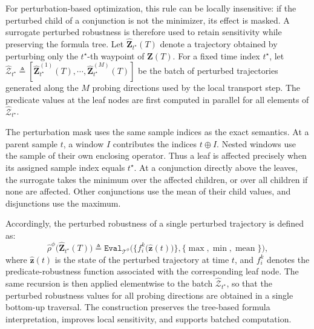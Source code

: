  For perturbation-based optimization, this rule can be
locally insensitive: if the perturbed child of a conjunction is not the
minimizer, its effect is masked. A surrogate perturbed robustness is therefore
used to retain sensitivity while preserving the formula tree.
Let $\widehat{\mathbf{Z}}_{t^\star}(T)$ denote a trajectory obtained by
perturbing only the $t^\star$-th waypoint of $\mathbf{Z}(T)$.
For a fixed time index $t^\star$, let
$\widehat{\boldsymbol{\mathcal{Z}}}_{t^\star}\triangleq
[\widehat{\mathbf{Z}}_{t^\star}^{(1)}(T),\cdots,
\widehat{\mathbf{Z}}_{t^\star}^{(M)}(T)]$
be the batch of perturbed trajectories generated along the $M$ probing
directions used by the local transport step.
The predicate values at the leaf nodes are first computed in parallel
for all elements of
$\widehat{\boldsymbol{\mathcal{Z}}}_{t^\star}$.
\begin{revision}
The perturbation mask uses the same sample indices as the exact semantics.
At a parent sample $t$, a window $I$ contributes the indices $t\oplus I$.
Nested windows use the sample of their own enclosing operator. Thus a
leaf is affected precisely when its assigned sample index equals $t^\star$.
At a conjunction directly above the leaves, the surrogate takes the minimum
over the affected children, or over all children if none are affected.
Other conjunctions use the mean of their child values, and disjunctions
use the maximum.
\end{revision}
Accordingly, the perturbed robustness of a single perturbed trajectory is
defined as:
\begin{equation}
\label{ch06:eq:perturbed-robustness}
\widehat{\rho}^{\phi}\big(\widehat{\mathbf{Z}}_{t^\star}(T)\big)
\triangleq
\texttt{Eval}_{\mathcal{T}^{\phi}}
\Big(
\big\{f_i^k\big(\widehat{\mathbf{z}}(t)\big)\big\},
\{\max,\min,\operatorname{mean}\}
\Big),
\end{equation}
where $\widehat{\mathbf{z}}(t)$ is the state of the perturbed trajectory
at time $t$, and $f_i^k$ denotes the predicate-robustness function
associated with the corresponding leaf node.
The same recursion is then applied elementwise to the batch
$\widehat{\boldsymbol{\mathcal{Z}}}_{t^\star}$, so that the perturbed
robustness values for all probing directions are obtained in a single
bottom-up traversal.
The construction preserves the tree-based formula interpretation, improves
local sensitivity, and supports batched computation. 


